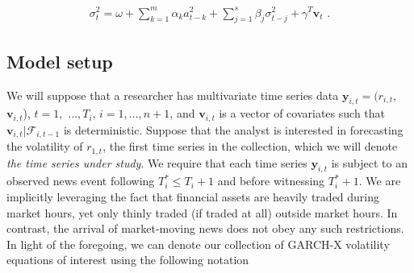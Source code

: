 \documentclass[11pt,3p,review,authoryear]{elsarticle}
\newcommand{\y}{\textbf{y}}
\newcommand{\x}{\textbf{v}}
\theoremstyle{definition}
\begin{document}
\begin{align}
\sigma_{t}^{2} = \omega+ \sum^{m}_{k=1}\alpha_{k}a^{2}_{t-k} + \sum_{j=1}^{s}\beta_{j}\sigma_{t-j}^{2} + \gamma^{T}\x_{t} \text{ .}\label{GARCH-X}
\end{align}


\subsection{Model setup}
\label{modelsetup}
We will suppose that a researcher has multivariate time series data $\y_{i,t} = (r_{i,t}$, $\x_{i,t}$), $t = 1,$ $\ldots,  T_i$, $i = 1, \ldots, n+1$, and  $\x_{i,t}$ is a vector of covariates such that $\x_{i,t}|\mathcal{F}_{i,t-1}$ is deterministic.  Suppose that the analyst is interested in forecasting the volatility of $r_{1,t}$, the first time series in the collection, which we will denote \textit{the time series under study}.  We require that each time series $\y_{i,t}$ is subject to an observed news event following $T^*_i \leq T_{i} + 1$ and before witnessing $T^*_i+1$.  We are implicitly leveraging the fact that financial assets are heavily traded during market hours, yet only thinly traded (if traded at all) outside market hours.  In contrast, the arrival of market-moving news does not obey any such restrictions.  In light of the foregoing, we can denote our collection of GARCH-X volatility equations of interest using the following notation
\end{document}

